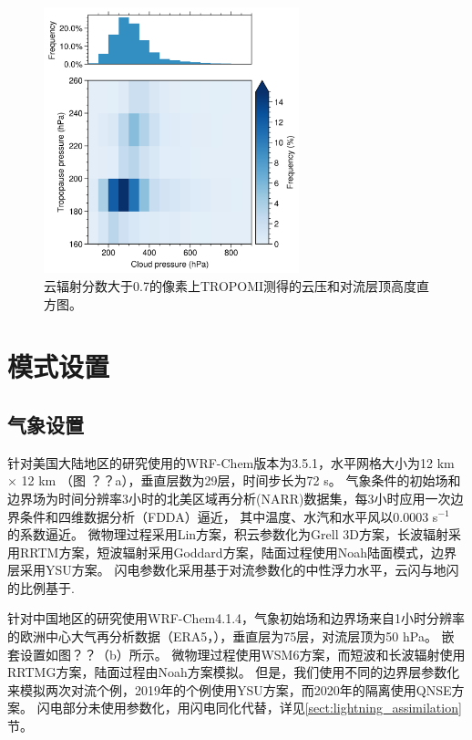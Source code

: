 \begin{figure}[htbp]
\centering
\includegraphics[width=20em]{./figures/pcld_ptropo.png}
\caption{云辐射分数大于0.7的像素上TROPOMI测得的云压和对流层顶高度直方图。}
\label{figure:pcld_ptropo}
\end{figure}

\section{模式设置}

\subsection{气象设置}

针对美国大陆地区的研究使用的WRF-Chem版本为3.5.1，水平网格大小为12 km $\times$ 12 km （图 ？？a），垂直层数为29层，时间步长为72 s。
气象条件的初始场和边界场为时间分辨率3小时的北美区域再分析(NARR)数据集，每3小时应用一次边界条件和四维数据分析（FDDA）逼近，
其中温度、水汽和水平风以0.0003 s$^{-1}$ 的系数逼近\citep{Laughner.2017}。
微物理过程采用Lin方案\citep{Lin.1983}，积云参数化为Grell 3D方案\citep{Grell.1993a,Grell.2002a}，长波辐射采用RRTM方案\citep{Iacono.2008}，短波辐射采用Goddard方案，陆面过程使用Noah陆面模式\citep{Koren.1999}，边界层采用YSU方案\citep{Hong.2006}。
闪电参数化采用基于对流参数化的中性浮力水平\citep{Pickering.1992}，云闪与地闪的比例基于\citet{Boccippio.2001}.

针对中国地区的研究使用WRF-Chem4.1.4，气象初始场和边界场来自1小时分辨率的欧洲中心大气再分析数据（ERA5，\citet{Hersbach.2020}），垂直层为75层，对流层顶为50 hPa。
嵌套设置如图？？（b）所示。
微物理过程使用WSM6方案\citep{Hong.2006a}，而短波和长波辐射使用RRTMG方案，陆面过程由Noah方案模拟。
但是，我们使用不同的边界层参数化来模拟两次对流个例，2019年的个例使用YSU方案，而2020年的隔离使用QNSE方案\citep{Sukoriansky.2005}。
闪电部分未使用参数化，用闪电同化代替，详见\ref{sect:lightning_assimilation}节。

